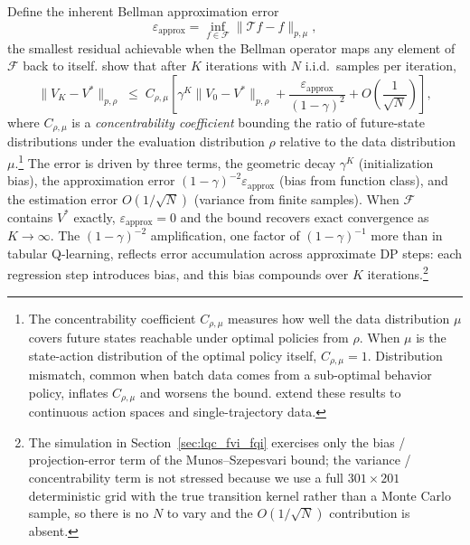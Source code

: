 Define the inherent Bellman approximation error
\begin{equation}
\varepsilon_{\mathrm{approx}} = \inf_{f \in \mathcal{F}} \| \mathcal{T} f - f \|_{p,\mu},
\end{equation}
the smallest residual achievable when the Bellman operator maps any element of $\mathcal{F}$ back to itself. \citet{MunosSzepesvari2008} show that after $K$ iterations with $N$ i.i.d.\ samples per iteration,
\begin{equation}
\| V_{K} - V^* \|_{p,\rho} \;\leq\; C_{\rho,\mu} \left[ \gamma^K \|V_0 - V^*\|_{p,\rho} + \frac{\varepsilon_{\mathrm{approx}}}{(1-\gamma)^2} + O\!\left(\frac{1}{\sqrt{N}}\right) \right],
\label{eq:fvi_error_bound}
\end{equation}
where $C_{\rho,\mu}$ is a \emph{concentrability coefficient} bounding the ratio of future-state distributions under the evaluation distribution $\rho$ relative to the data distribution $\mu$.\footnote{The concentrability coefficient $C_{\rho,\mu}$ measures how well the data distribution $\mu$ covers future states reachable under optimal policies from $\rho$. When $\mu$ is the state-action distribution of the optimal policy itself, $C_{\rho,\mu} = 1$. Distribution mismatch, common when batch data comes from a sub-optimal behavior policy, inflates $C_{\rho,\mu}$ and worsens the bound. \citet{Antos2008} extend these results to continuous action spaces and single-trajectory data.} The error is driven by three terms, the geometric decay $\gamma^K$ (initialization bias), the approximation error $(1-\gamma)^{-2} \varepsilon_{\mathrm{approx}}$ (bias from function class), and the estimation error $O(1/\sqrt{N})$ (variance from finite samples). When $\mathcal{F}$ contains $V^*$ exactly, $\varepsilon_{\mathrm{approx}} = 0$ and the bound recovers exact convergence as $K \to \infty$. The $(1-\gamma)^{-2}$ amplification, one factor of $(1-\gamma)^{-1}$ more than in tabular Q-learning, reflects error accumulation across approximate DP steps: each regression step introduces bias, and this bias compounds over $K$ iterations.\footnote{The simulation in Section~\ref{sec:lqc_fvi_fqi} exercises only the bias / projection-error term of the Munos--Szepesvari bound; the variance / concentrability term is not stressed because we use a full $301 \times 201$ deterministic grid with the true transition kernel rather than a Monte Carlo sample, so there is no $N$ to vary and the $O(1/\sqrt{N})$ contribution is absent.}


